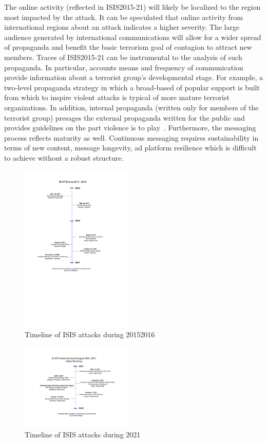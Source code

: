 \documentclass[letterpaper]{article}
\begin{document}
The online activity (reflected in ISIS2015-21)  will likely be localized to the region most impacted by the attack. It can be speculated that online activity from international regions about an attack indicates a higher severity. The large audience generated by international communications will allow for a wider spread of propaganda and benefit the basic terrorism goal of contagion to attract new members. Traces of ISIS2015-21 can be instrumental to the analysis of such propaganda.  In particular, accounts means and frequency of communication  provide information about a terrorist group's developmental stage. For example, a two-level propaganda strategy in which a broad-based of popular support is built from which to inspire violent attacks is typical of more mature terrorist organizations. In addition, internal propaganda (written only for members of the terrorist group) presages the external propaganda written for the public and provides guidelines on the part violence is to play~\cite{international1975clandestine}. Furthermore, the messaging process reflects maturity as well. Continuous messaging requires sustainability in terms of new content, message longevity, ad platform resilience which is difficult to achieve without a robust structure.


\begin{figure}[ht]
\includegraphics[width=0.48\textwidth]{img/Timeline2015-2016.pdf}
\caption{Timeline of ISIS attacks during 20152016}
\label{fig:Timeline2015-2016}
\end{figure}

\begin{figure}[ht]
\includegraphics[width=0.48\textwidth]{img/Timeline2021.pdf}
\caption{Timeline of ISIS attacks during 2021}
\label{fig:Timeline2021}
\end{figure}
\end{document}
